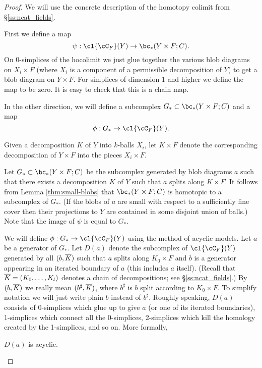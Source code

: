\begin{proof}
We will use the concrete description of the homotopy colimit from \S\ref{ss:ncat_fields}.

First we define a map 
\[
	\psi: \cl{\cC_F}(Y) \to \bc_*(Y\times F;C) .
\]
On 0-simplices of the hocolimit 
we just glue together the various blob diagrams on $X_i\times F$
(where $X_i$ is a component of a permissible decomposition of $Y$) to get a blob diagram on
$Y\times F$.
For simplices of dimension 1 and higher we define the map to be zero.
It is easy to check that this is a chain map.

In the other direction, we will define a subcomplex $G_*\sub \bc_*(Y\times F;C)$
and a map
\[
	\phi: G_* \to \cl{\cC_F}(Y) .
\]

Given a decomposition $K$ of $Y$ into $k$-balls $X_i$, let $K\times F$ denote the corresponding
decomposition of $Y\times F$ into the pieces $X_i\times F$.

Let $G_*\sub \bc_*(Y\times F;C)$ be the subcomplex generated by blob diagrams $a$ such that there
exists a decomposition $K$ of $Y$ such that $a$ splits along $K\times F$.
It follows from Lemma \ref{thm:small-blobs} that $\bc_*(Y\times F; C)$ 
is homotopic to a subcomplex of $G_*$.
(If the blobs of $a$ are small with respect to a sufficiently fine cover then their
projections to $Y$ are contained in some disjoint union of balls.)
Note that the image of $\psi$ is equal to $G_*$.

We will define $\phi: G_* \to \cl{\cC_F}(Y)$ using the method of acyclic models.
Let $a$ be a generator of $G_*$.
Let $D(a)$ denote the subcomplex of $\cl{\cC_F}(Y)$ generated by all $(b, \overline{K})$
such that $a$ splits along $K_0\times F$ and $b$ is a generator appearing
in an iterated boundary of $a$ (this includes $a$ itself).
(Recall that $\overline{K} = (K_0,\ldots,K_l)$ denotes a chain of decompositions;
see \S\ref{ss:ncat_fields}.)
By $(b, \overline{K})$ we really mean $(b^\sharp, \overline{K})$, where $b^\sharp$ is 
$b$ split according to $K_0\times F$.
To simplify notation we will just write plain $b$ instead of $b^\sharp$.
Roughly speaking, $D(a)$ consists of 0-simplices which glue up to give
$a$ (or one of its iterated boundaries), 1-simplices which connect all the 0-simplices, 
2-simplices which kill the homology created by the 
1-simplices, and so on.
More formally,
 
\begin{lemma} \label{lem:d-a-acyclic}
$D(a)$ is acyclic.
\end{lemma}


\end{proof}
